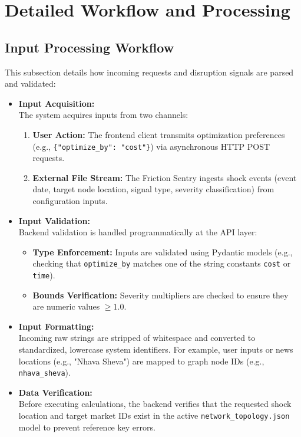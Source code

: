 \section[Detailed Workflow and Processing]{Detailed Workflow and Processing}

\subsection[Input Processing Workflow]{Input Processing Workflow}
This subsection details how incoming requests and disruption signals are parsed and validated:

\begin{itemize}
    \item \textbf{Input Acquisition:} \\
    The system acquires inputs from two channels:
    \begin{enumerate}
        \item \textbf{User Action:} The frontend client transmits optimization preferences (e.g., \texttt{\{"optimize\_by": "cost"\}}) via asynchronous HTTP POST requests.
        \item \textbf{External File Stream:} The Friction Sentry ingests shock events (event date, target node location, signal type, severity classification) from configuration inputs.
    \end{enumerate}
    \item \textbf{Input Validation:} \\
    Backend validation is handled programmatically at the API layer:
    \begin{itemize}
        \item \textbf{Type Enforcement:} Inputs are validated using Pydantic models (e.g., checking that \texttt{optimize\_by} matches one of the string constants \texttt{cost} or \texttt{time}).
        \item \textbf{Bounds Verification:} Severity multipliers are checked to ensure they are numeric values $\geq 1.0$.
    \end{itemize}
    \item \textbf{Input Formatting:} \\
    Incoming raw strings are stripped of whitespace and converted to standardized, lowercase system identifiers. For example, user inputs or news locations (e.g., "Nhava Sheva") are mapped to graph node IDs (e.g., \texttt{nhava\_sheva}).
    \item \textbf{Data Verification:} \\
    Before executing calculations, the backend verifies that the requested shock location and target market IDs exist in the active \texttt{network\_topology.json} model to prevent reference key errors.
\end{itemize}

